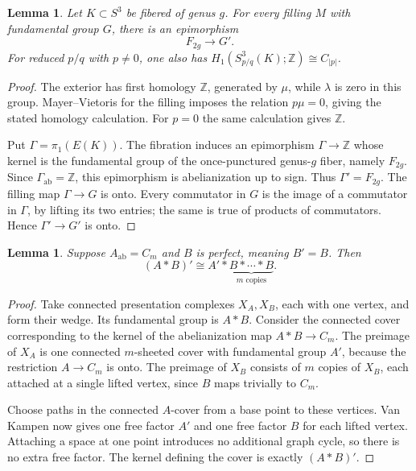 \documentclass[11pt]{article}
\newtheorem{lemma}[theorem]{Lemma}
\theoremstyle{remark}
\newcommand{\Z}{\mathbb Z}
\newcommand{\ab}{\mathrm{ab}}
\begin{document}
\begin{lemma}\label{lem:fiber}
Let $K\subset S^3$ be fibered of genus $g$. For every filling $M$ with fundamental group $G$, there is an epimorphism
\[
 F_{2g}\longrightarrow G'.
\]
For reduced $p/q$ with $p\ne0$, one also has $H_1(S^3_{p/q}(K);\Z)\cong C_{|p|}$.
\end{lemma}
\begin{proof}
The exterior has first homology $\Z$, generated by $\mu$, while $\lambda$ is zero in this group. Mayer--Vietoris for the filling imposes the relation $p\mu=0$, giving the stated homology calculation. For $p=0$ the same calculation gives $\Z$.

Put $\Gamma=\pi_1(E(K))$. The fibration induces an epimorphism $\Gamma\to\Z$ whose kernel is the fundamental group of the once-punctured genus-$g$ fiber, namely $F_{2g}$. Since $\Gamma_{\ab}=\Z$, this epimorphism is abelianization up to sign. Thus $\Gamma'=F_{2g}$. The filling map $\Gamma\to G$ is onto. Every commutator in $G$ is the image of a commutator in $\Gamma$, by lifting its two entries; the same is true of products of commutators. Hence $\Gamma'\to G'$ is onto.
\end{proof}

\begin{lemma}\label{lem:perfect-cover}
Suppose $A_{\ab}=C_m$ and $B$ is perfect, meaning $B'=B$. Then
\[
 (A*B)'\cong A'*\underbrace{B*\cdots*B}_{m\text{ copies}}.
\]
\end{lemma}
\begin{proof}
Take connected presentation complexes $X_A,X_B$, each with one vertex, and form their wedge. Its fundamental group is $A*B$. Consider the connected cover corresponding to the kernel of the abelianization map $A*B\to C_m$. The preimage of $X_A$ is one connected $m$-sheeted cover with fundamental group $A'$, because the restriction $A\to C_m$ is onto. The preimage of $X_B$ consists of $m$ copies of $X_B$, each attached at a single lifted vertex, since $B$ maps trivially to $C_m$.

Choose paths in the connected $A$-cover from a base point to these vertices. Van Kampen now gives one free factor $A'$ and one free factor $B$ for each lifted vertex. Attaching a space at one point introduces no additional graph cycle, so there is no extra free factor. The kernel defining the cover is exactly $(A*B)'$.
\end{proof}
\end{document}
